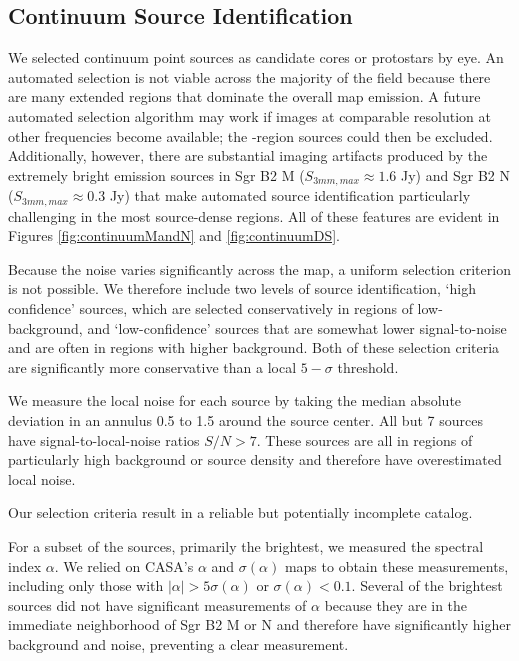 \documentclass[twocolumn]{aastex61}
\begin{document}
\subsection{Continuum Source Identification}
\label{sec:contsources}
We selected continuum point sources as candidate cores or protostars by eye.
An automated selection is not viable across the majority of the field because
there are many extended \hii regions that dominate the overall map emission.  A
future automated selection algorithm may work if images at comparable
resolution at other frequencies become available; the \hii-region sources could
then be excluded.  Additionally, however, there are substantial imaging
artifacts produced by the extremely bright emission sources in Sgr B2 M ($S_{3
mm,max} \approx 1.6$ Jy) and Sgr B2 N ($S_{3 mm,max} \approx 0.3$ Jy) that make automated
source identification particularly challenging in the most source-dense regions.
All of these features are evident in Figures \ref{fig:continuumMandN} and
\ref{fig:continuumDS}.

Because the noise varies significantly across the map, a uniform selection
criterion is not possible.  We therefore include two levels of source
identification, `high confidence' sources, which are selected conservatively in
regions of low-background, and `low-confidence' sources that are somewhat lower
signal-to-noise and are often in regions with higher background.  Both of
these selection criteria are significantly more conservative than a local
$5-\sigma$ threshold.

We measure the local noise for each source by taking the median absolute
deviation in an annulus 0.5 to 1.5 \arcsec around the source center.
All but 7 sources have signal-to-local-noise ratios $S/N>7$.  These
sources are all in regions of particularly high background or source
density and therefore have overestimated local noise.

Our selection criteria result in a reliable but potentially incomplete catalog.

For a subset of the sources, primarily the brightest, we measured the spectral
index $\alpha$.  We relied on CASA's $\alpha$ and $\sigma(\alpha)$ maps to
obtain these measurements, including only those with $|\alpha| > 5
\sigma(\alpha)$ or $\sigma(\alpha) < 0.1$.  Several of the brightest sources
did not have significant measurements of $\alpha$ because they are in the
immediate neighborhood of Sgr B2 M or N and therefore have significantly higher
background and noise, preventing a clear measurement.
\end{document}
